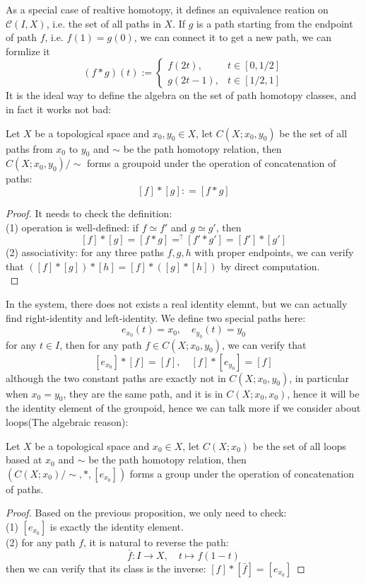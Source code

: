 As a special case of realtive homotopy, it defines an equivalence reation on \(\mathcal{C}(I,X)\), i.e. the set of all paths in \(X\). If \(g\) is a path starting from the endpoint of path \(f\), i.e. \(f(1) = g(0)\), we can connect it to get a new path, we can formlize it
\[(f*g)(t) := \begin{cases}
    f(2t), &t\in[0,1/2] \\
    g(2t-1), &t\in[1/2,1]
\end{cases}\]
It is the ideal way to define the algebra on the set of path homotopy classes, and in fact it works not bad:
\begin{proposition}
    Let \(X\) be a topological space and \(x_0,y_0 \in X\), let \(C(X;x_0,y_0)\) be the set of all paths from \(x_0\) to \(y_0\) and \(\sim \) be the path homotopy relation, then \(C(X;x_0,y_0)/\sim\) forms a groupoid under the operation of concatenation of paths:
    \[[f]*[g]: = [f*g]\]
\end{proposition}
\begin{proof}
    It needs to check the definition:\\
    (1) operation is well-defined: if \(f \simeq f'\) and \(g \simeq g'\), then \[[f]*[g] = [f*g] =^? [f'*g'] = [f']*[g']\]
    (2) associativity: for any three paths \(f,g,h\) with proper endpoints, we can verify that \(([f]*[g])*[h] = [f]*([g]*[h])\) by direct computation.\\
\end{proof}

In the system, there does not exists a real identity elemnt, but we can actually find right-identity and left-identity. We define two special paths here:
\[e_{x_0}(t) = x_0 ,\quad e_{y_0}(t) = y_0\]
for any \(t \in I\), then for any path \(f \in C(X;x_0,y_0)\), we can verify that
\[[e_{x_0}]*[f] = [f] ,\quad [f]*[e_{y_0}] = [f]\]
although the two constant paths are exactly not in \(C(X;x_0,y_0)\), in particular when \(x_0 = y_0\), they are the same path, and it is in \(C(X;x_0,x_0)\), hence it will be the identity element of the groupoid, hence we can talk more if we consider about loops(The algebraic reason):

\begin{proposition}
    Let \(X\) be a topological space and \(x_0 \in X\), let \(C(X;x_0)\) be the set of all loops based at \(x_0\) and \(\sim \) be the path homotopy relation, then \((C(X;x_0)/\sim, *, [e_{x_0}])\) forms a group under the operation of concatenation of paths.
\end{proposition}
\begin{proof}
    Based on the previous proposition, we only need to check:\\
    (1) \([e_{x_0}]\) is exactly the identity element.\\
    (2) for any path \(f\), it is natural to reverse the path:
    \[\bar{f}:I \to X, \quad t \mapsto f(1-t)\]
    then we can verify that its class is the inverse: \([f]*[\bar{f}] = [e_{x_0}]\)
\end{proof}

